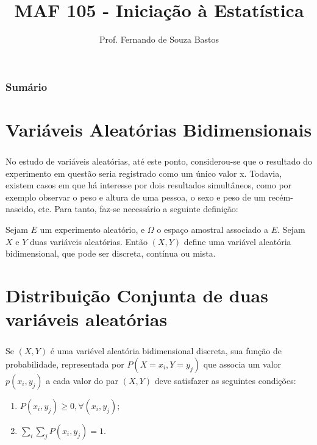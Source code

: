 \documentclass[14pt,aspectratio=1610]{beamer}
\title{MAF 105 - Iniciação à Estatística}
\author{Prof. Fernando de Souza Bastos}
\institute{Instituto de Ciências Exatas e Tecnológicas\texorpdfstring{\\ Universidade Federal de Viçosa}{}\texorpdfstring{\\ Campus UFV - Florestal}{}}
\date[\today]{}
\begin{document}


\frame{\titlepage}

\begin{frame}{}
\frametitle{\bf Sumário}
\tableofcontents
\end{frame}

\section{Variáveis Aleatórias Bidimensionais}
\begin{frame}{}
\frametitle{}
\begin{block}{}
\justifying
No estudo de variáveis aleatórias, até este ponto, considerou-se que o resultado do experimento em questão seria registrado como um único valor x. Todavia, existem casos em que há interesse por dois resultados simultâneos, como por exemplo observar o peso e altura de uma pessoa, o sexo e peso de um recém-nascido, etc. Para tanto, faz-se necessário a seguinte definição:

Sejam $E$ um experimento aleatório, e $\Omega$ o espaço amostral associado a $E$.
Sejam $X$ e $Y$ duas variáveis aleatórias. Então $(X, Y )$ define uma variável aleatória bidimensional, que pode ser discreta, contínua ou mista.
\end{block}
\end{frame}

\section{Distribuição Conjunta de duas variáveis aleatórias}
\begin{frame}{}
\frametitle{}
\begin{block}{}
\justifying
Se $(X, Y )$ é uma variével aleatória bidimensional discreta, sua função de
probabilidade, representada por $P(X = x_{i}, Y = y_{j})$ que associa um valor $p(x_{i}, y_{j})$ a cada
valor do par $(X, Y )$ deve satisfazer as seguintes condições:

\begin{enumerate}
\item $P(x_{i}, y_{j})\geq 0, \forall (x_{i}, y_{j});$
\item $\displaystyle \sum_{i} \sum_{j} P(x_{i}, y_{j}) = 1.$
\end{enumerate}
\end{block}
\end{frame}
\end{document}
